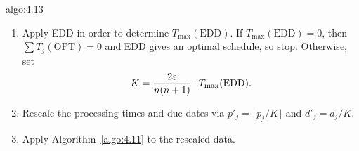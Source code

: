 \begin{algo}{algo:4.13}
    \begin{enumerate}[(1)]
        \item Apply EDD in order to determine $T_{\max}(\text{EDD})$. 
        If $T_{\max}(\text{EDD}) = 0$, then $\sum T_j(\text{OPT}) = 0$ 
        and EDD gives an optimal schedule, so stop. Otherwise, set 
        \[ K = \frac{2\varepsilon}{n(n+1)} \cdot T_{\max}(\text{EDD}). \] 
        \item Rescale the processing times and due dates via 
        $p'_j = \lfloor p_j/K \rfloor$ and $d'_j = d_j/K$. 
        \item Apply Algorithm~\ref{algo:4.11} to the rescaled data. 
    \end{enumerate}
\end{algo}